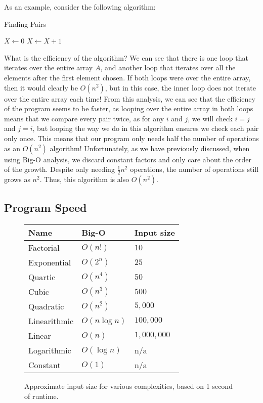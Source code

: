 As an example, consider the following algorithm:

\begin{algorithm}[H]
\caption{Finding Pairs}
\begin{algorithmic}
\State $ X \gets 0 $
            \State $X \gets X + 1$
        \EndIf
    \EndFor
\EndFor
\end{algorithmic}
\end{algorithm}


What is the efficiency of the algorithm?  We can see that there is one loop that iterates over the entire array $ A $, and another loop that iterates over all the elements after the first element chosen.  If both loops were over the entire array, then it would clearly be $ O(n^2) $, but in this case, the inner loop does not iterate over the entire array each time!  From this analysis, we can see that the efficiency of the program seems to be faster, as looping over the entire array in both loops means that we compare every pair twice, as for any $ i $ and $ j $, we will check $ i = j $ and $ j = i $, but looping the way we do in this algorithm ensures we check each pair only once.  This means that our program only needs half the number of operations as an $ O(n^2) $ algorithm!  Unfortunately, as we have previously discussed, when using Big-O analysis, we discard constant factors and only care about the order of the growth.  Despite only needing $ \frac{1}{2}n^2 $ operations, the number of operations still grows as $n^2$.  Thus, this algorithm is also $ O(n^2) $.

\subsection{Program Speed}

\begin{figure}
\centering
\begin{tabular}{| l | l | l |}
  \hline
  \textbf{Name} & \textbf{Big-O} & \textbf{Input size}  \\ \hline
  Factorial    & $ O(n!) $      & $ 10 $ \\ \hline
  Exponential  & $ O(2^n) $     & $ 25 $ \\ \hline
  Quartic      & $ O(n^4) $     & $ 50 $ \\ \hline
  Cubic        & $ O(n^3) $     & $ 500 $ \\ \hline
  Quadratic    & $ O(n^2) $     & $ 5,000 $ \\ \hline
  Linearithmic & $ O(n\log n) $ & $ 100,000 $ \\ \hline
  Linear       & $ O(n) $       & $ 1,000,000 $ \\ \hline
  Logarithmic  & $ O(\log n) $  & n/a\footnotemark[1] \\ \hline
  Constant     & $ O(1) $       & n/a\footnotemark[1] \\ \hline
\end{tabular}
\caption{Approximate input size for various complexities, based on 1 second of runtime.}
\label{input-size-table}
\end{figure}


